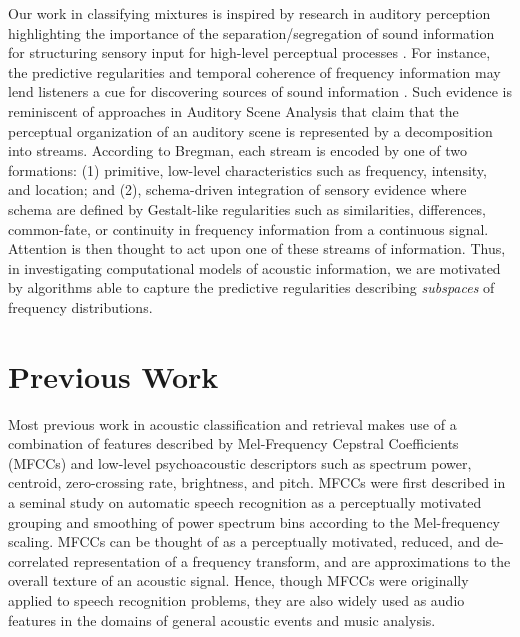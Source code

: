 \documentclass[a4paper,11pt,final]{ThesisStyle}
\begin{document}
Our work in classifying mixtures is inspired by research in auditory perception highlighting the importance of the separation/segregation of sound information for structuring sensory input for high-level perceptual processes \cite{Winkler2009a,Teki2011a}.  For instance, the predictive regularities and temporal coherence of frequency information may lend listeners a cue for discovering sources of sound information \cite{Winkler2009a, Shamma2011}.  Such evidence is reminiscent of approaches in Auditory Scene Analysis \cite{Bregman1990} that claim that the perceptual organization of an auditory scene is represented by a decomposition into streams.  According to Bregman, each stream is encoded by one of two formations: (1) primitive, low-level characteristics such as frequency, intensity, and location; and (2), schema-driven integration of sensory evidence where schema are defined by Gestalt-like regularities such as similarities, differences, common-fate, or continuity in frequency information from a continuous signal.  Attention is then thought to act upon one of these streams of information.  Thus, in investigating computational models of acoustic information, we are motivated by algorithms able to capture the predictive regularities describing \textit{subspaces} of frequency distributions. 


\section{Previous Work}

Most previous work in acoustic classification and retrieval makes use of a combination of features described by Mel-Frequency Cepstral Coefficients (MFCCs) and low-level psychoacoustic descriptors \cite{Temko2007,Guo2003a,McKinney2003,Allamanche2001} such as spectrum power, centroid, zero-crossing rate, brightness, and pitch.  MFCCs were first described in a seminal study on automatic speech recognition \cite{Davis1980} as a perceptually motivated grouping and smoothing of power spectrum bins according to the Mel-frequency scaling.  MFCCs can be thought of as a perceptually motivated, reduced, and de-correlated representation of a frequency transform, and are approximations to the overall texture of an acoustic signal.  Hence, though MFCCs were originally applied to speech recognition problems, they are also widely used as audio features in the domains of general acoustic events \cite{Temko2007} and music \cite{Pampalk2006a,McKinney2003} analysis.  
\end{document}
